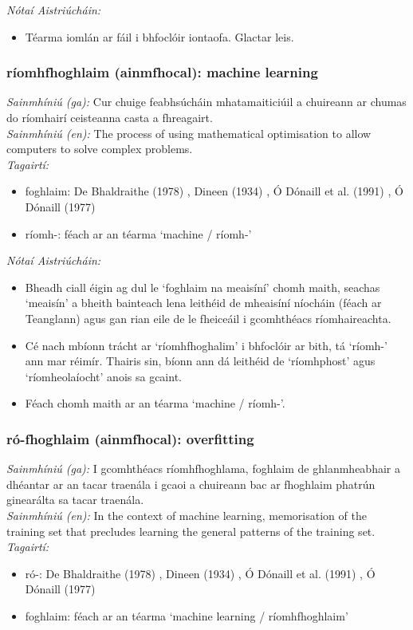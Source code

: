 \documentclass{article}
\begin{document}
 \noindent \textit{Nótaí Aistriúcháin:}
\begin{itemize}
	\item Téarma iomlán ar fáil i bhfoclóir iontaofa. Glactar leis.
\end{itemize}


\subsubsection*{ríomhfhoghlaim (ainmfhocal): machine learning}
 \noindent \textit{Sainmhíniú (ga):} Cur chuige feabhsúcháin mhatamaiticiúil a chuireann ar chumas do ríomhairí ceisteanna casta a fhreagairt.
\\
 \noindent \textit{Sainmhíniú (en):} The process of using mathematical optimisation to allow computers to solve complex problems.
\\
 \noindent \textit{Tagairtí:}
\begin{itemize}
	\item foghlaim: De Bhaldraithe (1978) \cite{de-bhaldraithe}, Dineen (1934) \cite{dineen}, Ó Dónaill et al. (1991) \cite{focloir-beag}, Ó Dónaill (1977) \cite{odonaill}
	\item ríomh-: féach ar an téarma `machine / ríomh-'
\end{itemize}

 \noindent \textit{Nótaí Aistriúcháin:}
\begin{itemize}
	\item Bheadh ciall éigin ag dul le `foghlaim na meaisíní' chomh maith, seachas `meaisín' a bheith bainteach lena leithéid de mheaisíní níocháin (féach ar Teanglann) agus gan rian eile de le fheiceáil i gcomhthéacs ríomhaireachta.
	\item Cé nach mbíonn trácht ar `ríomhfhoghalim' i bhfoclóir ar bith, tá `ríomh-' ann mar réimír. Thairis sin, bíonn ann dá leithéid de `ríomhphost' agus `ríomheolaíocht' anois sa gcaint.
	\item Féach chomh maith ar an téarma `machine / ríomh-'.
\end{itemize}


\subsubsection*{ró-fhoghlaim (ainmfhocal): overfitting}
 \noindent \textit{Sainmhíniú (ga):} I gcomhthéacs ríomhfhoghlama, foghlaim de ghlanmheabhair a dhéantar ar an tacar traenála i gcaoi a chuireann bac ar fhoghlaim phatrún ginearálta sa tacar traenála.
\\
 \noindent \textit{Sainmhíniú (en):} In the context of machine learning, memorisation of the training set that precludes learning the general patterns of the training set.
\\
 \noindent \textit{Tagairtí:}
\begin{itemize}
	\item ró-: De Bhaldraithe (1978) \cite{de-bhaldraithe}, Dineen (1934) \cite{dineen}, Ó Dónaill et al. (1991) \cite{focloir-beag}, Ó Dónaill (1977) \cite{odonaill}
	\item foghlaim: féach ar an téarma `machine learning / ríomhfhoghlaim'
\end{itemize}
\end{document}
